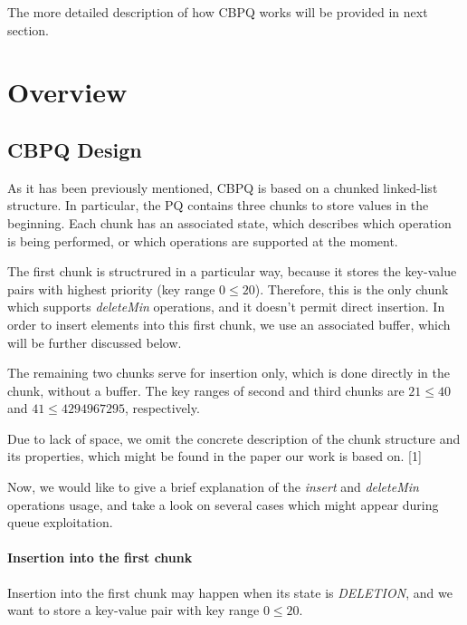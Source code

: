 \documentclass{article}
\begin{document}
The more detailed description of how CBPQ works will be provided in next section.

\section{Overview}
\subsection{CBPQ Design}

As it has been previously mentioned, CBPQ is based on a chunked linked-list structure. In particular, the PQ contains three chunks to store values in the beginning. Each chunk has an associated state, which describes which operation is being performed, or which operations are supported at the moment.\par

The first chunk is structrured in a particular way, because it stores the key-value pairs with highest priority (key range $0 \leqslant 20$). Therefore, this is the only chunk which supports \textit{deleteMin} operations, and it doesn't permit direct insertion. In order to insert elements into this first chunk, we use an associated buffer, which will be further discussed below.\par

The remaining two chunks serve for insertion only, which is done directly in the chunk, without a buffer. The key ranges of second and third chunks are $21 \leqslant 40$ and $41 \leqslant 4294967295$, respectively.\par
Due to lack of space, we omit the concrete description of the chunk structure and its properties, which might be found in the paper our work is based on. [1]\par

Now, we would like to give a brief explanation of the \textit{insert} and \textit{deleteMin} operations usage, and take a look on several cases which might appear during queue exploitation.

\paragraph{Insertion into the first chunk}\mbox{}\par

Insertion into the first chunk may happen when its state is \emph{DELETION}, and we want to store a key-value pair with key range $0 \leqslant 20$.\par
\end{document}

